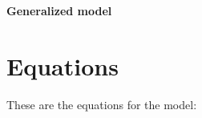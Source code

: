 \documentclass{article}%
\begin{document}
%
\normalsize%
\begin{center}%
\section*{}%
\label{sec:}%
\begin{Large}%
\textbf{Generalized model}%
\end{Large}

%
\end{center}%
\section{Equations}%
\label{sec:Equations}%
\begin{large}%
These are the equations for the model:%
\end{large}
\end{document}
